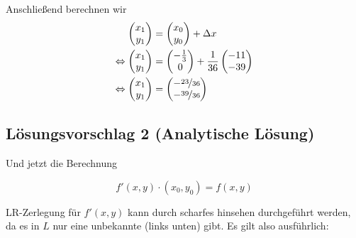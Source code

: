 Anschließend berechnen wir
\begin{align}
	\begin{pmatrix}
		x_1\\
		y_1
	\end{pmatrix} &= 
	\begin{pmatrix}
		x_0\\
		y_0
	\end{pmatrix}+\Delta x \\
	\Leftrightarrow\begin{pmatrix}
		x_1\\
		y_1
	\end{pmatrix} &= 
	\begin{pmatrix}
		-\frac{1}{3}\\
		0
	\end{pmatrix} +
    \frac{1}{36}
	\begin{pmatrix}
		-11\\
		-39
	\end{pmatrix} \\
	\Leftrightarrow\begin{pmatrix}
		x_1\\
		y_1
	\end{pmatrix} &= 
	\begin{pmatrix}
		-\nicefrac{23}{36}\\
		-\nicefrac{39}{36}
	\end{pmatrix}
\end{align}


\subsection*{Lösungsvorschlag 2 (Analytische Lösung)}
Und jetzt die Berechnung %

\[f'(x, y) \cdot (x_0, y_0) = f(x,y)\] %

LR-Zerlegung für $f'(x, y)$ kann durch scharfes hinsehen durchgeführt
werden, da es in $L$ nur eine unbekannte (links unten) gibt. Es gilt
also ausführlich:

